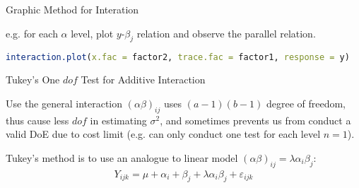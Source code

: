 \begin{point}
    Graphic Method for Interation
\end{point}

e.g. for each $ \alpha  $ level, plot $ y $-$ \beta _j $ relation and observe the parallel relation.

\begin{rcode}
\begin{lstlisting}[language=R]
interaction.plot(x.fac = factor2, trace.fac = factor1, response = y)
\end{lstlisting}
\end{rcode}


\begin{point}
    Tukey's One $ dof $ Test for Additive Interaction
\end{point}

Use the general interaction $ (\alpha \beta )_{ij} $ uses $ (a-1)(b-1) $ degree of freedom, thus cause less $ dof $ in estimating $ \sigma ^2 $, and sometimes prevents us from conduct a valid DoE due to cost limit (e.g. can only conduct one test for each level $ n=1 $). 

Tukey's method is to use an analogue to  linear model $ (\alpha \beta )_{ij}=\lambda \alpha _i\beta _j $:
\begin{align}
    Y_{ijk}=\mu +\alpha _i+\beta _j+\lambda \alpha_{i} \beta_{j}+\varepsilon _{ijk} 
\end{align}

